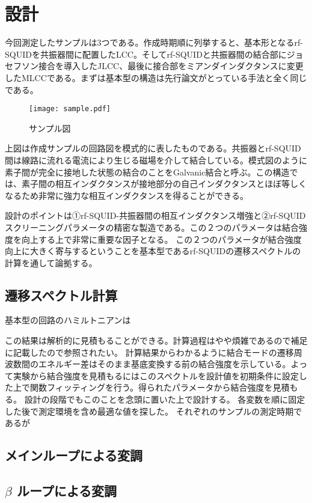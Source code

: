 \section{設計}
        今回測定したサンプルは3つである。作成時期順に列挙すると、基本形となるrf-SQUIDを共振器間に配置したLCC。そしてrf-SQUIDと共振器間の結合部にジョセフソン接合を導入したJLCC、最後に接合部をミアンダインダクタンスに変更したMLCCである。まずは基本型の構造は先行論文がとっている手法と全く同じである。
        \begin{figure}[H]
            \centering
            \texttt{[image: sample.pdf]}
            \caption{サンプル図}
        \end{figure}
        上図は作成サンプルの回路図を模式的に表したものである。共振器とrf-SQUID間は線路に流れる電流により生じる磁場を介して結合している。模式図のように素子間が完全に接地した状態の結合のことをGalvanic結合と呼ぶ。この構造では、素子間の相互インダクタンスが接地部分の自己インダクタンスとほぼ等しくなるため非常に強力な相互インダクタンスを得ることができる。

        設計のポイントは①rf-SQUID-共振器間の相互インダクタンス増強と②rf-SQUIDスクリーニングパラメータの精密な製造である。この２つのパラメータは結合強度を向上する上で非常に重要な因子となる。
        この２つのパラメータが結合強度向上に大きく寄与するということを基本型であるrf-SQUIDの遷移スペクトルの計算を通して論拠する。
    \subsection{遷移スペクトル計算}
        基本型の回路のハミルトニアンは
        
        この結果は解析的に見積もることができる。計算過程はやや煩雑であるので補足に記載したので参照されたい。
        計算結果からわかるように結合モードの遷移周波数間のエネルギー差はそのまま基底変換する前の結合強度を示している。よって実験から結合強度を見積もるにはこのスペクトルを設計値を初期条件に設定した上で関数フィッティングを行う。得られたパラメータから結合強度を見積もる。
        設計の段階でもこのことを念頭に置いた上で設計する。
        各変数を順に固定した後で測定環境を含め最適な値を探した。
        それぞれのサンプルの測定時期であるが
    \subsection{メインループによる変調}
    \subsection{$\beta$ ループによる変調}

